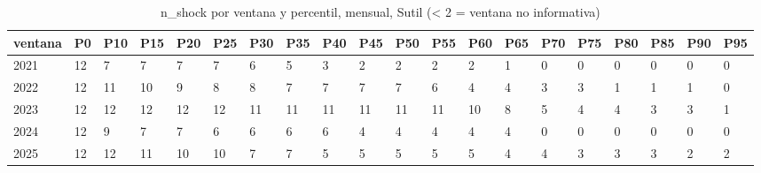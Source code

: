 \begin{table}[H]
\centering
\small
\caption{n\_shock por ventana y percentil, mensual, Sutil (< 2 = ventana no informativa)}
\label{tab:T_barrido_n_shock_mensual_sutil}
\begin{tabular}{llllllllllllllllllll}
\toprule
ventana & P0 & P10 & P15 & P20 & P25 & P30 & P35 & P40 & P45 & P50 & P55 & P60 & P65 & P70 & P75 & P80 & P85 & P90 & P95 \\
\midrule
2021 & 12 & 7 & 7 & 7 & 7 & 6 & 5 & 3 & 2 & 2 & 2 & 2 & 1 & 0 & 0 & 0 & 0 & 0 & 0 \\
2022 & 12 & 11 & 10 & 9 & 8 & 8 & 7 & 7 & 7 & 7 & 6 & 4 & 4 & 3 & 3 & 1 & 1 & 1 & 0 \\
2023 & 12 & 12 & 12 & 12 & 12 & 11 & 11 & 11 & 11 & 11 & 11 & 10 & 8 & 5 & 4 & 4 & 3 & 3 & 1 \\
2024 & 12 & 9 & 7 & 7 & 6 & 6 & 6 & 6 & 4 & 4 & 4 & 4 & 4 & 0 & 0 & 0 & 0 & 0 & 0 \\
2025 & 12 & 12 & 11 & 10 & 10 & 7 & 7 & 5 & 5 & 5 & 5 & 5 & 4 & 4 & 3 & 3 & 3 & 2 & 2 \\
\bottomrule
\end{tabular}
\end{table}
